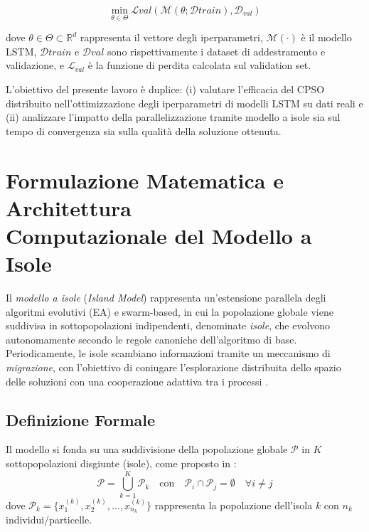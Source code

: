 \documentclass{article}
\begin{document}
\begin{equation}
\min_{\theta \in \Theta} \mathcal{L}{val}(\mathcal{M}(\theta; \mathcal{D}{train}), \mathcal{D}_{val})
\end{equation}

dove $\theta \in \Theta \subset \mathbb{R}^d$ rappresenta il vettore degli iperparametri, $\mathcal{M}(\cdot)$ è il modello LSTM, $\mathcal{D}{train}$ e $\mathcal{D}{val}$ sono rispettivamente i dataset di addestramento e validazione, e $\mathcal{L}_{val}$ è la funzione di perdita calcolata sul validation set.

L’obiettivo del presente lavoro è duplice: (i) valutare l’efficacia del CPSO distribuito nell’ottimizzazione degli iperparametri di modelli LSTM su dati reali e (ii) analizzare l’impatto della parallelizzazione tramite modello a isole sia sul tempo di convergenza sia sulla qualità della soluzione ottenuta.

\section{Formulazione Matematica e Architettura \\Computazionale del Modello a Isole}

Il \textit{modello a isole} (\textit{Island Model}) rappresenta un'estensione parallela degli algoritmi 
evolutivi (EA) e swarm-based, in cui la popolazione globale viene suddivisa in sottopopolazioni 
indipendenti, denominate \textit{isole}, che evolvono autonomamente secondo le regole canoniche 
dell'algoritmo di base. Periodicamente, le isole scambiano informazioni tramite un meccanismo di 
\textit{migrazione}, con l’obiettivo di coniugare l'esplorazione distribuita dello spazio delle soluzioni 
con una cooperazione adattiva tra i processi \cite{tomassini2005spatially, cantupaz1998survey}.

\subsection{Definizione Formale}

Il modello si fonda su una suddivisione della popolazione globale $\mathcal{P}$ in $K$ sottopopolazioni 
disgiunte (isole), come proposto in \cite{alba2002parallelism, tomassini2005spatially}:
\[
\mathcal{P} = \bigcup_{k=1}^K \mathcal{P}_k \quad \text{con} \quad \mathcal{P}_i \cap \mathcal{P}_j = \emptyset \quad \forall i \neq j
\]
dove $\mathcal{P}_k = \{x_1^{(k)}, x_2^{(k)}, \dots, x_{n_k}^{(k)}\}$ rappresenta la popolazione dell'isola $k$ con $n_k$ individui/particelle.
\end{document}
